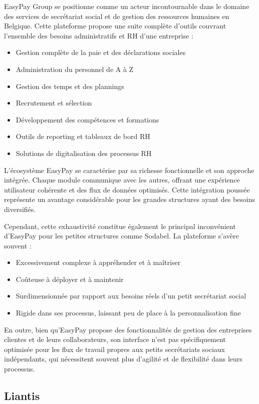 EasyPay Group se positionne comme un acteur incontournable dans le domaine des services de secrétariat social et de gestion des ressources humaines en Belgique. Cette plateforme propose une suite complète d'outils couvrant l'ensemble des besoins administratifs et RH d'une entreprise :

\begin{itemize}
  \item Gestion complète de la paie et des déclarations sociales
  \item Administration du personnel de A à Z
  \item Gestion des temps et des plannings
  \item Recrutement et sélection
  \item Développement des compétences et formations
  \item Outils de reporting et tableaux de bord RH
  \item Solutions de digitalisation des processus RH
\end{itemize}

L'écosystème EasyPay se caractérise par sa richesse fonctionnelle et son approche intégrée. Chaque module communique avec les autres, offrant une expérience utilisateur cohérente et des flux de données optimisés. Cette intégration poussée représente un avantage considérable pour les grandes structures ayant des besoins diversifiés.

Cependant, cette exhaustivité constitue également le principal inconvénient d'EasyPay pour les petites structures comme Sodabel. La plateforme s'avère souvent :
\begin{itemize}
  \item Excessivement complexe à appréhender et à maîtriser
  \item Coûteuse à déployer et à maintenir
  \item Surdimensionnée par rapport aux besoins réels d'un petit secrétariat social
  \item Rigide dans ses processus, laissant peu de place à la personnalisation fine
\end{itemize}

En outre, bien qu'EasyPay propose des fonctionnalités de gestion des entreprises clientes et de leurs collaborateurs, son interface n'est pas spécifiquement optimisée pour les flux de travail propres aux petits secrétariats sociaux indépendants, qui nécessitent souvent plus d'agilité et de flexibilité dans leurs processus.

\subsection{Liantis}

